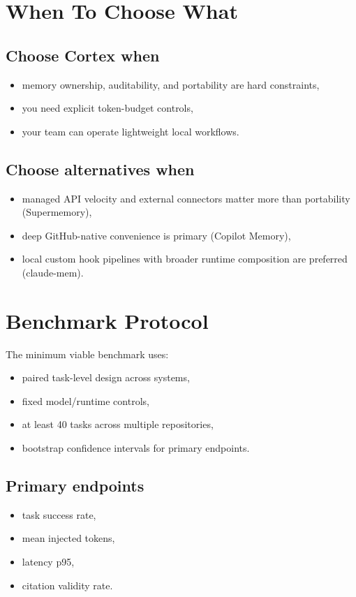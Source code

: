 \documentclass[10pt,twocolumn]{article}
\begin{document}
\section{When To Choose What}
\subsection{Choose Cortex when}
\begin{itemize}
  \item memory ownership, auditability, and portability are hard constraints,
  \item you need explicit token-budget controls,
  \item your team can operate lightweight local workflows.
\end{itemize}

\subsection{Choose alternatives when}
\begin{itemize}
  \item managed API velocity and external connectors matter more than portability (Supermemory),
  \item deep GitHub-native convenience is primary (Copilot Memory),
  \item local custom hook pipelines with broader runtime composition are preferred (claude-mem).
\end{itemize}

\section{Benchmark Protocol}
The minimum viable benchmark uses:
\begin{itemize}
  \item paired task-level design across systems,
  \item fixed model/runtime controls,
  \item at least 40 tasks across multiple repositories,
  \item bootstrap confidence intervals for primary endpoints.
\end{itemize}

\subsection{Primary endpoints}
\begin{itemize}
  \item task success rate,
  \item mean injected tokens,
  \item latency p95,
  \item citation validity rate.
\end{itemize}
\end{document}
